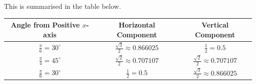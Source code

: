 \documentclass{article}
\begin{document}
This is summarised in the table below.
\begin{table}[H]
    \centering
    \begin{tabular}{c c c}
        \toprule
        \textbf{Angle from Positive \(x\)-axis}   & \textbf{Horizontal Component}                              & \textbf{Vertical Component}                                \\
        \midrule
        \(\displaystyle\frac{\pi}{6} = 30^\circ\) & \(\displaystyle\frac{\sqrt{3}}{2} \approx \num{0.866025}\) & \(\displaystyle\frac{1}{2} = 0.5\)                         \\[2ex]
        \(\displaystyle\frac{\pi}{4} = 45^\circ\) & \(\displaystyle\frac{\sqrt{2}}{2} \approx \num{0.707107}\) & \(\displaystyle\frac{\sqrt{2}}{2} \approx \num{0.707107}\) \\[2ex]
        \(\displaystyle\frac{\pi}{6} = 30^\circ\) & \(\displaystyle\frac{1}{2} = 0.5\)                         & \(\displaystyle\frac{\sqrt{3}}{2} \approx \num{0.866025}\) \\[2ex]
        \bottomrule
    \end{tabular}
\end{table}
\end{document}
